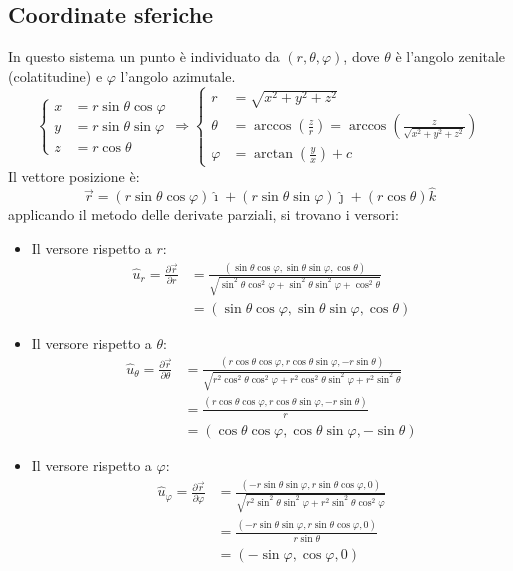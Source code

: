\documentclass[11pt, a4paper, openright]{book}
\theoremstyle{plain}
\theoremstyle{definition}
\begin{document}
\subsection{Coordinate sferiche}
In questo sistema un punto è individuato da $(r, \theta, \varphi)$, dove $\theta$ è l'angolo zenitale (colatitudine) e $\varphi$ l'angolo azimutale.
\[
\begin{cases}
    x & = r\sin\theta\cos\varphi \\
    y & = r\sin\theta\sin\varphi \\
    z & = r\cos\theta
\end{cases} 
\Rightarrow 
\begin{cases}
    r & = \sqrt{x^2 + y^2 + z^2} \\
    \theta & =  \arccos(\frac{z}{r}) = \arccos(\frac{z}{\sqrt{x^2 + y^2 + z^2}})\\
    \varphi & = \arctan(\frac{y}{x}) + c
\end{cases}
\]
Il vettore posizione è:
\[\vec{r} = (r\sin\theta\cos\varphi)\hat{\imath} + (r\sin\theta\sin\varphi)\hat{\jmath} + (r\cos\theta)\hat{k}\]
applicando il metodo delle derivate parziali, si trovano i versori:

\begin{itemize}
    \item Il versore rispetto a $r$:
        \begin{align}
            \hat{u}_r = \frac{\partial \vec{r}}{\partial r} & = \frac{(\sin\theta\cos\varphi, \sin\theta\sin\varphi, \cos\theta)}{\sqrt{\sin^2\theta\cos^2\varphi + \sin^2\theta\sin^2\varphi + \cos^2\theta}} \\
            & = (\sin\theta\cos\varphi, \sin\theta\sin\varphi, \cos\theta)
        \end{align}
    \item Il versore rispetto a $\theta$:
        \begin{align}
            \hat{u}_\theta = \frac{\partial \vec{r}}{\partial \theta} & = \frac{(r\cos\theta\cos\varphi, r\cos\theta\sin\varphi, -r\sin\theta)}{\sqrt{r^2\cos^2\theta\cos^2\varphi + r^2\cos^2\theta\sin^2\varphi + r^2\sin^2\theta}} \\
                & = \frac{(r\cos\theta\cos\varphi, r\cos\theta\sin\varphi, -r\sin\theta)}{r}  \\
                & = (\cos\theta\cos\varphi, \cos\theta\sin\varphi, -\sin\theta)
        \end{align}
    \item Il versore rispetto a $\varphi$:
        \begin{align}
            \hat{u}_\varphi = \frac{\partial \vec{r}}{\partial \varphi} & = \frac{(-r\sin\theta\sin\varphi, r\sin\theta\cos\varphi, 0)}{\sqrt{r^2\sin^2\theta\sin^2\varphi + r^2\sin^2\theta\cos^2\varphi}} \\
            & = \frac{(-r\sin\theta\sin\varphi, r\sin\theta\cos\varphi, 0)}{r\sin\theta} \\
            & = (-\sin\varphi, \cos\varphi, 0)
        \end{align}
\end{itemize}
\end{document}
